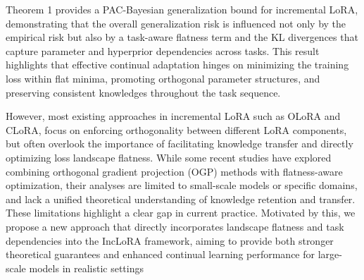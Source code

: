 \documentclass[letterpaper]{article} %
\begin{document}

Theorem 1 provides a PAC-Bayesian generalization bound for incremental LoRA, demonstrating that the overall generalization risk is influenced not only by the empirical risk but also by a task-aware flatness term and the KL divergences that capture parameter and hyperprior dependencies across tasks. This result highlights that effective continual adaptation hinges on minimizing the training loss within flat minima, promoting orthogonal parameter structures, and preserving consistent knowledges throughout the task sequence.

However, most existing approaches in incremental LoRA such as OLoRA and CLoRA, focus on enforcing orthogonality between different LoRA components, but often overlook the importance of facilitating knowledge transfer and directly optimizing loss landscape flatness. While some recent studies have explored combining orthogonal gradient projection (OGP) methods with flatness-aware optimization, their analyses are limited to small-scale models or specific domains, and lack a unified theoretical understanding of knowledge retention and transfer. These limitations highlight a clear gap in current practice. Motivated by this, we propose a new approach that directly incorporates landscape flatness and task dependencies into the IncLoRA framework, aiming to provide both stronger theoretical guarantees and enhanced continual learning performance for large-scale models in realistic settings





\end{document}
